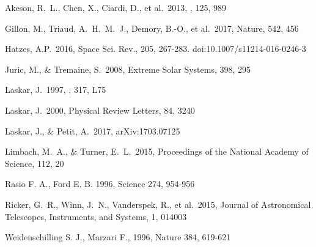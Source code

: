 \documentclass[letter]{aa} %
\begin{document}
        
        \begin{thebibliography}{}
                
 Akeson, R.~L., Chen, X., Ciardi, D., et al.\ 2013, \pasp, 125, 989           

 Gillon, M., Triaud, A.~H.~M.~J., Demory, B.-O., et al.\ 2017, Nature, 542, 456 
                
 Hatzes, A.P.\ 2016, Space Sci. Rev., 205, 267-283. doi:10.1007/s11214-016-0246-3

 Juric, M., \& Tremaine, S.\ 2008, Extreme Solar Systems, 398, 295

 Laskar, J.\ 1997, \aap, 317, L75 
                
 Laskar, J.\ 2000, Physical Review Letters, 84, 3240
                
 Laskar, J., \& Petit, A.\ 2017, arXiv:1703.07125

 Limbach, M.~A., \& Turner, E.~L.\ 2015, Proceedings of the National Academy of Science, 112, 20 
                
 Rasio F. A., Ford E. B. 1996, Science 274, 954-956            

 Ricker, G.~R., Winn, J.~N., Vanderspek, R., et al.\ 2015, Journal of Astronomical Telescopes, Instruments, and Systems, 1, 014003
                
  Weidenschilling S. J., Marzari F., 1996, Nature 384, 619-621

                        
                
        \end{thebibliography}
        
\end{document}
